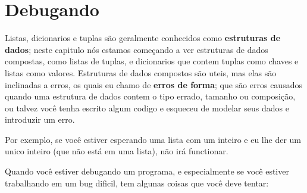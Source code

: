 \section{Debugando}


Listas, dicionarios e tuplas são geralmente conhecidos como {\bf estruturas
de dados}; neste capitulo nós estamos começando a ver estruturas de dados
compostas, como listas de tuplas, e dicionarios que contem tuplas como
chaves e listas como valores. Estruturas de dados compostos são uteis, mas
elas são inclinadas a erros, os quais eu chamo de {\bf erros de forma};
que são erros causados quando uma estrutura de dados contem o tipo errado,
tamanho ou composição, ou talvez você tenha escrito algum codigo e esqueceu de 
modelar seus dados e introduzir um erro.

Por exemplo, se você estiver esperando uma lista com um inteiro e eu
lhe der um unico inteiro (que não está em uma lista), não irá functionar.

Quando você estiver debugando um programa, e especialmente se você
estiver trabalhando em um bug dificil, tem algunas coisas que você 
deve tentar:

